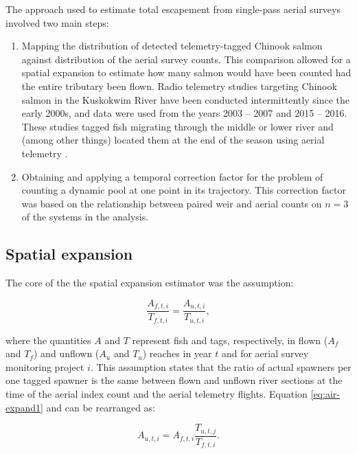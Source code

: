 \documentclass[12pt,]{book}
\theoremstyle{definition}
\theoremstyle{definition}
\theoremstyle{definition}
\theoremstyle{remark}
\begin{document}
The approach used to estimate total escapement from single-pass aerial
surveys involved two main steps:

\begin{enumerate}
\def\labelenumi{(\arabic{enumi})}
\item
  Mapping the distribution of detected telemetry-tagged Chinook salmon
  against distribution of the aerial survey counts. This comparison
  allowed for a spatial expansion to estimate how many salmon would have
  been counted had the entire tributary been flown. Radio telemetry
  studies targeting Chinook salmon in the Kuskokwim River have been
  conducted intermittently since the early 2000s, and data were used
  from the years 2003 -- 2007 and 2015 -- 2016. These studies tagged
  fish migrating through the middle or lower river and (among other
  things) located them at the end of the season using aerial telemetry
  \citep{stuby-2007, smith-liller-2017a, smith-liller-2017b}.
\item
  Obtaining and applying a temporal correction factor for the problem of
  counting a dynamic pool at one point in its trajectory. This
  correction factor was based on the relationship between paired weir
  and aerial counts on \(n=3\) of the systems in the analysis.
\end{enumerate}

\subsection{Spatial expansion}\label{spat-expansion}

\noindent
The core of the the spatial expansion estimator was the assumption:

\begin{equation}
  \frac{A_{f,t,i}}{T_{f,t,i}} = \frac{A_{u,t,i}}{T_{u,t,i}},
  \label{eq:air-expand1}
\end{equation}

\noindent
where the quantities \(A\) and \(T\) represent fish and tags,
respectively, in flown (\(A_f\) and \(T_f\)) and unflown (\(A_u\) and
\(T_u\)) reaches in year \(t\) and for aerial survey monitoring project
\(i\). This assumption states that the ratio of actual spawners per one
tagged spawner is the same between flown and unflown river sections at
the time of the aerial index count and the aerial telemetry flights.
Equation \eqref{eq:air-expand1} and can be rearranged as:

\begin{equation}
  A_{u,t,i} = A_{f,t,i} \frac{T_{u,t,j}}{T_{f,t,i}}.
  \label{eq:air-expand2}
\end{equation}
\end{document}
